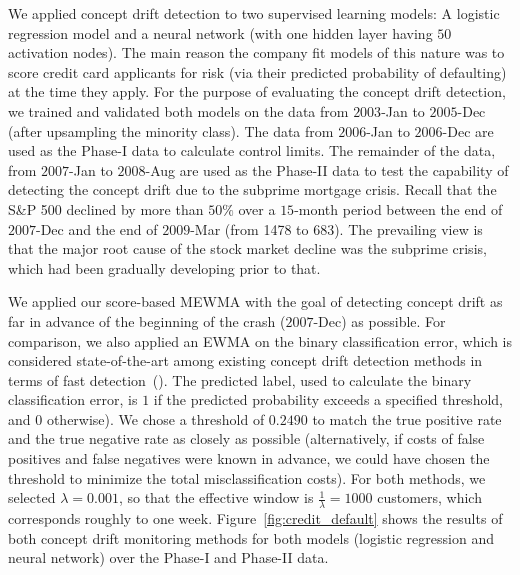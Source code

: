 \documentclass[twoside,11pt]{article}
\begin{document}
We applied concept drift detection to two supervised learning models:  A logistic regression model and a neural network (with one hidden layer having $50$ activation nodes). The main reason the company fit models of this nature was to score credit card applicants for risk (via their predicted probability of defaulting) at the time they apply. For the purpose of evaluating the concept drift detection, we trained and validated both models on the data from $2003$-Jan to $2005$-Dec (after upsampling the minority class). The data from $2006$-Jan to $2006$-Dec are used as the Phase-I data to calculate control limits. The remainder of the data, from $2007$-Jan to $2008$-Aug are used as the Phase-II data to test the capability of detecting the concept drift due to the subprime mortgage crisis. Recall that the S\&P 500 declined by more than $50\%$ over a $15$-month period between the end of $2007$-Dec and the end of $2009$-Mar (from 1478 to 683). The prevailing view is that the major root cause of the stock market decline was the subprime crisis, which had been gradually developing prior to that.

We applied our score-based MEWMA with the goal of detecting concept drift as far in advance of the beginning of the crash ($2007$-Dec) as possible. For comparison, we also applied an EWMA on the binary classification error, which is considered state-of-the-art among existing concept drift detection methods in terms of fast detection~(\cite{barros2018large}). The predicted label, used to calculate the binary classification error, is $1$ if the predicted probability exceeds a specified threshold, and $0$ otherwise). We chose a threshold of $0.2490$ to match the true positive rate and the true negative rate as closely as possible (alternatively, if costs of false positives and false negatives were known in advance, we could have chosen the threshold to minimize the total misclassification costs). For both methods, we selected $\lambda = 0.001$, so that the effective window is $\frac{1}{\lambda} = 1000$ customers, which corresponds roughly to one week. Figure~\ref{fig:credit_default} shows the results of both concept drift monitoring methods for both models (logistic regression and neural network) over the Phase-I and Phase-II data. 
\end{document}
